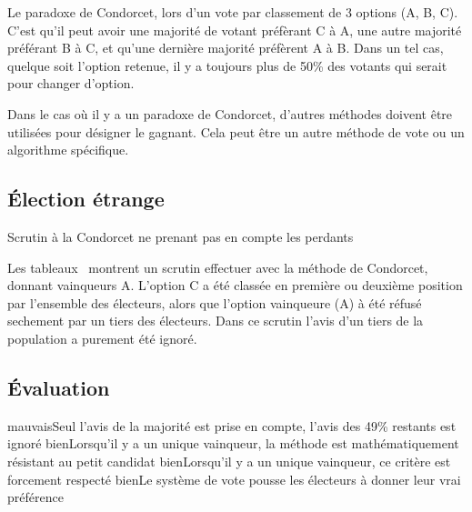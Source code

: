 \documentclass[../report]{subfiles}
\begin{document}
  Le paradoxe de Condorcet, lors d'un vote par classement de 3 options (A, B, C).
  C'est qu'il peut avoir une majorité de votant préfèrant C à A, une autre majorité 
  préférant B à C, et qu'une dernière majorité préfèrent A à B.
  Dans un tel cas, quelque soit l'option retenue, il y a toujours plus de 50\% des votants
  qui serait pour changer d'option.

  Dans le cas où il y a un paradoxe de Condorcet, d'autres méthodes doivent être utilisées pour désigner
  le gagnant.
  Cela peut être un autre méthode de vote ou un algorithme spécifique.
  \subsection{Élection étrange}
  \begin{table}[h]
    \begin{center}
      \caption{Scrutin à la Condorcet ne prenant pas en compte les perdants}%
      \label{fig:diff:condorcet:caslim1}
    \end{center}
  \end{table}

  Les tableaux~ montrent un scrutin effectuer avec la méthode de Condorcet,
  donnant vainqueurs A.
  L'option C a été classée en première ou deuxième position par l'ensemble des électeurs, alors que l'option
  vainqueure (A) à été réfusé sechement par un tiers des électeurs.
  Dans ce scrutin l'avis d'un tiers de la population a purement été ignoré.

  \subsection{Évaluation}
  \tabcritere%
    {mauvais}{Seul l'avis de la majorité est prise en compte, l'avis des 49\% restants est ignoré}%
    {bien}{Lorsqu'il y a un unique vainqueur, la méthode est mathématiquement résistant au petit candidat}%
    {bien}{Lorsqu'il y a un unique vainqueur, ce critère est forcement respecté}%
    {bien}{Le système de vote pousse les électeurs à donner leur vrai préférence}
\end{document}
